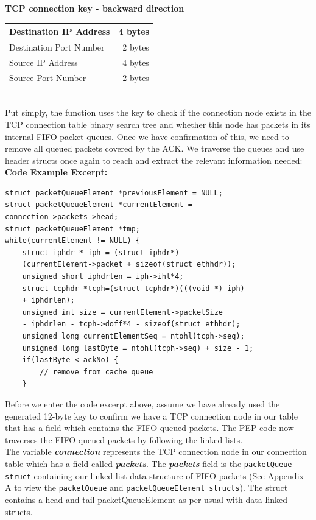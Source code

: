 \textbf{TCP connection key - backward direction} \\

\begin{tabular}{|l|r|}
	\hline
    Destination IP Address & 4 bytes\\
	\hline
    Destination Port Number & 2 bytes\\
    \hline 
    Source IP Address & 4 bytes\\
	\hline
    Source Port Number & 2 bytes\\
	\hline
\end{tabular} \\

Put simply, the function uses the key to check if the connection node exists in the TCP connection table binary search tree and whether this node has packets in its internal FIFO packet queues. Once we have confirmation of this, we need to remove all queued packets covered by the ACK. We traverse the queues and use header structs once again to reach and extract the relevant information needed:\\

\textbf{Code Example Excerpt:}\\

\begin{lstlisting}
struct packetQueueElement *previousElement = NULL;
struct packetQueueElement *currentElement = 
connection->packets->head; 
struct packetQueueElement *tmp;
while(currentElement != NULL) {
    struct iphdr * iph = (struct iphdr*)
    (currentElement->packet + sizeof(struct ethhdr)); 
    unsigned short iphdrlen = iph->ihl*4;
    struct tcphdr *tcph=(struct tcphdr*)(((void *) iph) 
    + iphdrlen);
    unsigned int size = currentElement->packetSize
    - iphdrlen - tcph->doff*4 - sizeof(struct ethhdr);
    unsigned long currentElementSeq = ntohl(tcph->seq);
    unsigned long lastByte = ntohl(tcph->seq) + size - 1; 
    if(lastByte < ackNo) { 
        // remove from cache queue
    } 
\end{lstlisting}

Before we enter the code excerpt above, assume we have already used the generated 12-byte key to confirm we have a TCP connection node in our table that has a field which contains the FIFO queued packets. The PEP code now traverses the FIFO queued packets by following the linked lists. \\

The variable \textbf{\emph{connection}} represents the TCP connection node in our connection table which has a field called \textbf{\emph{packets}}. The \textbf{\emph{packets}} field is the {\tt packetQueue struct} containing our linked list data structure of FIFO packets (See Appendix A to view the {\tt packetQueue} and {\tt packetQueueElement structs}). The struct contains a head and tail packetQueueElement as per usual with data linked structs.\\

